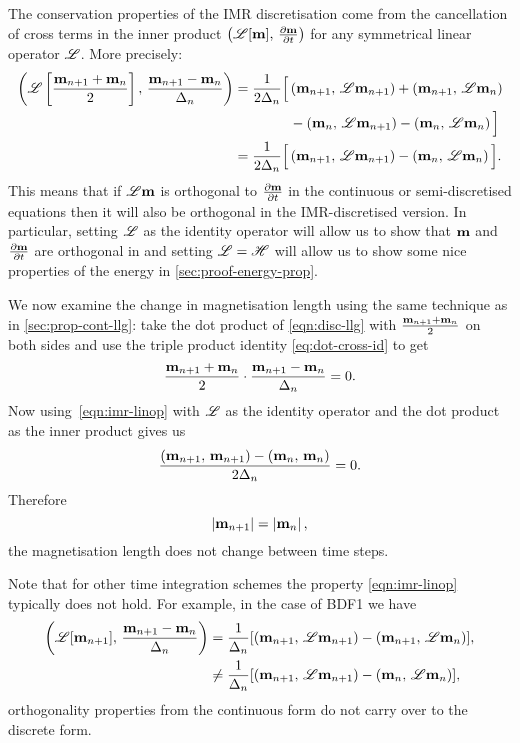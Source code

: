 The conservation properties of the IMR discretisation come from the cancellation of cross terms in the inner product $\left(\mathscr{L}[\boldsymbol{\mathrm{m}}],\, \frac{\partial \boldsymbol{\mathrm{m}}}{\partial t} \right)$ for any symmetrical linear operator $\mathscr{L}$.
More precisely:
\begin{equation}
  \begin{aligned}
    \label{eqn:imr-linop}
    \ip{\lop \left[ \frac{\mv_{n+1} + \mv_n}{2} \right]}{ \frac{\mv_{n+1} - \mv_n}{\dtn} }
    &= \frac{1}{2\dtn} \Big[
    \ip{\mv_{n+1}}{\lop \mv_{n+1}} + \ip{\mv_{n+1}}{\lop \mv_{n}} \\
    & \qquad\qquad - \ip{\mv_{n}}{\lop \mv_{n+1}} - \ip{\mv_{n}}{\lop \mv_{n}}
    \Big] \\
    &= \frac{1}{2\dtn} \Big[
    \ip{\mv_{n+1}}{\lop \mv_{n+1}}
    - \ip{\mv_{n}}{\lop \mv_{n}}
    \Big].
  \end{aligned}
\end{equation}
This means that if $\mathscr{L} \boldsymbol{\mathrm{m}}$ is orthogonal to $\frac{\partial \boldsymbol{\mathrm{m}}}{\partial t}$ in the continuous or semi-discretised equations then it will also be orthogonal in the IMR-discretised version.
In particular, setting $\mathscr{L}$ as the identity operator will allow us to show that $\boldsymbol{\mathrm{m}}$ and $\frac{\partial \boldsymbol{\mathrm{m}}}{\partial t}$ are orthogonal in  and setting $\mathscr{L} = \mathscr{H}$ will allow us to show some nice properties of the energy in \cref{sec:proof-energy-prop}.

We now examine the change in magnetisation length using the same technique as in \cref{sec:prop-cont-llg}: take the dot product of \cref{eqn:disc-llg} with $\frac{\boldsymbol{\mathrm{m}}_{n+1} + \boldsymbol{\mathrm{m}}_n}{2}$ on both sides and use the triple product identity \cref{eq:dot-cross-id} to get
\begin{equation}
  \label{eq:63}
  \frac{\mv_{n+1} + \mv_n}{2} \cdot \frac{\mv_{n+1} - \mv_n}{\dtn} = 0.
\end{equation}
Now using~\cref{eqn:imr-linop} with $\mathscr{L}$ as the identity operator and the dot product as the inner product gives us
\begin{equation}
  \frac{\left(\boldsymbol{\mathrm{m}}_{n+1},\, \boldsymbol{\mathrm{m}}_{n+1} \right) - \left(\boldsymbol{\mathrm{m}}_n,\, \boldsymbol{\mathrm{m}}_n \right) }{2 \Delta_{n}} = 0.
\end{equation}
Therefore
\begin{equation}
  \left|{\boldsymbol{\mathrm{m}}_{n+1}} \right| = \left|{\boldsymbol{\mathrm{m}}_n} \right|,
\end{equation}
\ie the magnetisation length does not change between time steps.

Note that for other time integration schemes the property \cref{eqn:imr-linop} typically does not hold.
For example, in the case of BDF1 we have
\begin{equation}
  \begin{aligned}
    \left(\mathscr{L} {\left[ \boldsymbol{\mathrm{m}}_{n+1} \right]},\,  \frac{\boldsymbol{\mathrm{m}}_{n+1} - \boldsymbol{\mathrm{m}}_n}{\Delta_{n}}  \right)
    &= \frac{1}{\Delta_{n}} {\left[  \left(\boldsymbol{\mathrm{m}}_{n+1},\, \mathscr{L} \boldsymbol{\mathrm{m}}_{n+1} \right)
      - \left(\boldsymbol{\mathrm{m}}_{n+1},\, \mathscr{L} \boldsymbol{\mathrm{m}}_n \right)  \right]}, \\
    &\neq \frac{1}{\Delta_{n}} {\left[  \left(\boldsymbol{\mathrm{m}}_{n+1},\, \mathscr{L} \boldsymbol{\mathrm{m}}_{n+1} \right)
      - \left(\boldsymbol{\mathrm{m}}_n,\, \mathscr{L} \boldsymbol{\mathrm{m}}_n \right)  \right]},
  \end{aligned}
\end{equation}
\ie orthogonality properties from the continuous form do not carry over to the discrete form.

